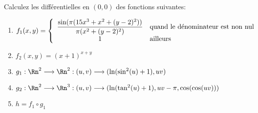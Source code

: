 
\begin{exercice}\label{exo0051}

Calculez les différentielles en  $(0,0)$ des fonctions suivantes:

\begin{enumerate}
\item $f_1(x,y)=\left\{\begin{array}{cl}
                        \dfrac{\sin(\pi(15x^3+x^2+(y-2)^2))}{\pi(x^2+(y-2)^2)} & {\rm quand \ le \ d\acute{e}nominateur \ est \ non \ nul}  \\
                        1             						    & {\rm ailleurs}
                        
                        \end{array}\right.$
\item $f_2(x,y)= (x+1)^{x+y}$
\item $g_1:\Rn^2\longrightarrow\Rn^2:(u,v)\longrightarrow(\ln(\sin^2(u)+1),uv)$
\item $g_2:\Rn^2\longrightarrow\Rn^3:(u,v)\longrightarrow(\ln(\tan^2(u)+1),uv-\pi, \cos(\cos(uv)))$
\item $h=f_1\circ g_1$
\end{enumerate}

\end{exercice}

